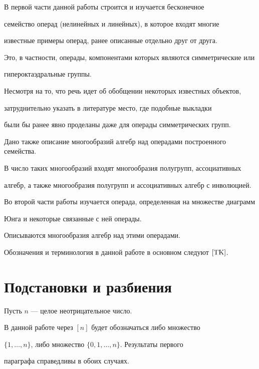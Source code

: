В первой части данной работы строится и изучается бесконечное


семейство операд (нелинейных и линейных), в которое входят многие


известные примеры операд, ранее описанные отдельно друг от друга.


Это, в частности, операды, компонентами которых являются симметрические или


гипероктаэдральные группы.


Несмотря на то, что речь идет об обобщении некоторых известных объектов,


затруднительно указать в литературе место, где подобные выкладки


были бы ранее явно проделаны даже для операды симметрических групп.


Дано также описание многообразий алгебр над операдами построенного семейства.


В число таких многообразий входят многообразия полугрупп, ассоциативных


алгебр, а также многообразия полугрупп и ассоциативных алгебр с инволюцией.





Во второй части работы изучается операда, определенная на множестве диаграмм


Юнга и некоторые связанные с ней операды.


Описываются многообразия алгебр над этими операдами.


Обозначения и терминология в данной работе в основном следуют $\cite{TK}$.














\section{Подстановки и разбиения}





Пусть $n$ --- целое неотрицательное число.


В данной работе через $[n]$ будет обозначаться либо множество 


$\{1,\dotsc,n\}$, либо множество $\{0,1,\dotsc,n\}$. Результаты первого


параграфа справедливы в обоих случаях.


